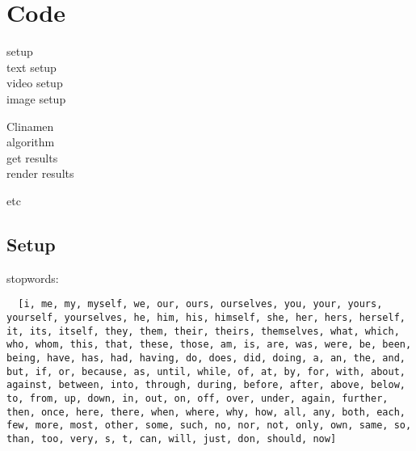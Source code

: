 
\chapter{Code}
\label{app:code}

setup\\
 text setup\\
 video setup\\
 image setup

Clinamen\\
 algorithm\\
 get results\\
 render results

 etc



\section{Setup}

stopwords:\\
\begin{verbatim}
  [i, me, my, myself, we, our, ours, ourselves, you, your, yours, yourself, yourselves, he, him, his, himself, she, her, hers, herself, it, its, itself, they, them, their, theirs, themselves, what, which, who, whom, this, that, these, those, am, is, are, was, were, be, been, being, have, has, had, having, do, does, did, doing, a, an, the, and, but, if, or, because, as, until, while, of, at, by, for, with, about, against, between, into, through, during, before, after, above, below, to, from, up, down, in, out, on, off, over, under, again, further, then, once, here, there, when, where, why, how, all, any, both, each, few, more, most, other, some, such, no, nor, not, only, own, same, so, than, too, very, s, t, can, will, just, don, should, now]
\end{verbatim}

